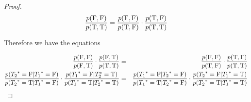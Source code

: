 \documentclass[runningheads,a4paper]{llncs}
\begin{document}
\begin{proof}
\begin{equation*}
\frac{p(\mathrm{F},\mathrm{F})}{p(\mathrm{T},\mathrm{T})} = \frac{p(\mathrm{F},\mathrm{F})}{p(\mathrm{T},\mathrm{F})} \cdot \frac{p(\mathrm{T},\mathrm{F})}{p(\mathrm{T},\mathrm{T})}
\end{equation*}

Therefore we have the equations

\begin{eqnarray}
\frac{p(\mathrm{F},\mathrm{F})}{p(\mathrm{F},\mathrm{T})} \cdot \frac{p(\mathrm{F},\mathrm{T})}{p(\mathrm{T},\mathrm{T})}&=&\frac{p(\mathrm{F},\mathrm{F})}{p(\mathrm{T},\mathrm{F})} \cdot \frac{p(\mathrm{T},\mathrm{F})}{p(\mathrm{T},\mathrm{T})} \\ \label{eq:joint}
\frac{p({T_{2}}^{*}\hspace{0.0ex}=\mathrm{F}|{T_{1}}^{*}\hspace{0.0ex}=\mathrm{F})}{p({T_{2}}^{*}\hspace{0.0ex} = \mathrm{T}| {T_{1}}^{*}\hspace{0.0ex}=\mathrm{F})} \cdot \frac{p({T_{1}}^{*}\hspace{0.0ex}=\mathrm{F}|{T}_{2}^{*}\hspace{0.0ex}=\mathrm{T})}{p({T_{1}}^{*}\hspace{0.0ex} = \mathrm{T}| {T_{2}}^{*}\hspace{0.0ex}=\mathrm{T})}&=&\frac{p({T_{1}}^{*}\hspace{0.0ex}=\mathrm{F}|{T_{2}}^{*}\hspace{0.0ex}=\mathrm{F})}{p({T_{1}}^{*}\hspace{0.0ex} = \mathrm{T}| {T_{2}}^{*}\hspace{0.0ex}=\mathrm{F})} \cdot \frac{p({T_{2}}^{*}\hspace{0.0ex}=\mathrm{F}|{T_{1}}^{*}\hspace{0.0ex}=\mathrm{T})}{p({T_{2}}^{*}\hspace{0.0ex} = \mathrm{T}| {T_{1}}^{*}\hspace{0.0ex}=\mathrm{T})} \label{eq:lowd-conditional}
\end{eqnarray}


\end{proof}
\end{document}
